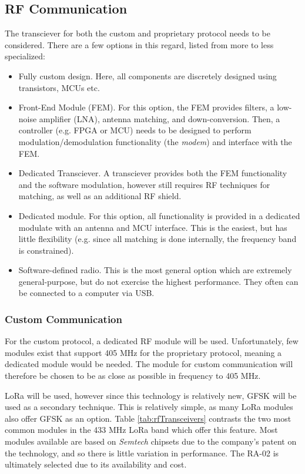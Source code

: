 \subsection{RF Communication}
The transciever for both the custom and proprietary protocol needs to be considered. There are a few options in this regard, listed from more to less specialized:
\begin{itemize}
    \item Fully custom design. Here, all components are discretely designed using transistors, MCUs etc.
    \item Front-End Module (FEM). For this option, the FEM provides filters, a low-noise amplifier (LNA), antenna matching, and down-conversion. Then, a controller (e.g. FPGA or MCU) needs to be designed to perform modulation/demodulation functionality (the \textit{modem}) and interface with the FEM.
    \item Dedicated Transciever. A transciever provides both the FEM functionality and the software modulation, however still requires RF techniques for matching, as well as an additional RF shield.
    \item Dedicated module. For this option, all functionality is provided in a dedicated modulate with an antenna and MCU interface. This is the easiest, but has little flexibility (e.g. since all matching is done internally, the frequency band is constrained).
    \item Software-defined radio. This is the most general option which are extremely general-purpose, but do not exercise the highest performance. They often can be connected to a computer via USB.
\end{itemize}

\subsubsection{Custom Communication}
For the custom protocol, a dedicated RF module will be used. Unfortunately, few modules exist that support 405 MHz for the proprietary protocol, meaning a dedicated module would be needed. The module for custom communication will therefore be chosen to be as close as possible in frequency to 405 MHz.

LoRa will be used, however since this technology is relatively new, GFSK will be used as a secondary technique. This is relatively simple, as many LoRa modules also offer GFSK as an option. Table \ref{tab:rfTransceivers} contrasts the two most common modules in the 433 MHz LoRa band which offer this feature. Most modules available are based on \textit{Semtech} chipsets due to the company's patent on the technology, and so there is little variation in performance. The RA-02 is ultimately selected due to its availability and cost.

